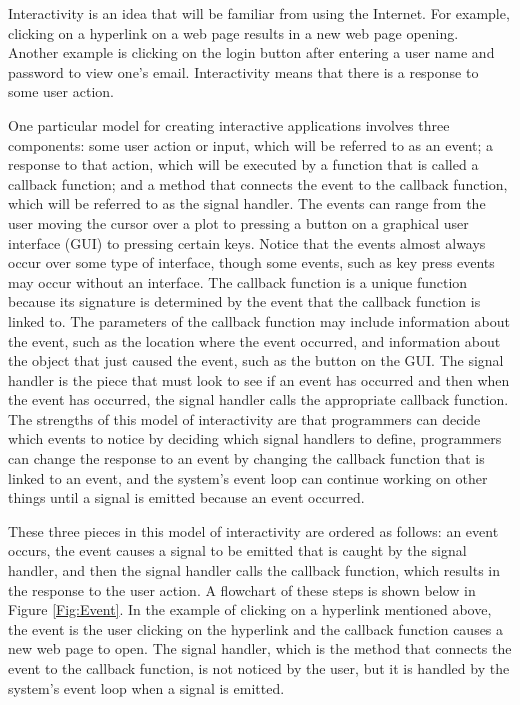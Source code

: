 \documentclass{article}[11pt]
\begin{document}
Interactivity is an idea that will be familiar from using the Internet.  For
example, clicking on a hyperlink on a web page results in a new web page
opening.  Another example is clicking on the login button after entering a
user name and password to view one's email.  Interactivity means that there is
a response to some user action.  

One particular model for creating interactive applications involves three
components: some user action or input, which will be referred to as an event;
a response to that action, which will be executed by a function that is called
a callback function; and a method that connects the event to the callback
function, which will be referred to as the signal handler.  The events can
range from the user moving the cursor over a plot to pressing a button on a
graphical user interface (GUI) to pressing certain keys.  Notice that the
events almost always occur over some type of interface, though some events,
such as key press events may occur without an interface.  The callback
function is a unique function because its signature is determined by the event
that the callback function is linked to.  The parameters of the callback
function may include information about the event, such as the location where
the event occurred, and information about the object that just caused the
event, such as the button on the GUI.  The signal handler is the piece that
must look to see if an event has occurred and then when the event has
occurred, the signal handler calls the appropriate callback function.  The
strengths of this model of interactivity are that programmers can decide which
events to notice by deciding which signal handlers to define, programmers
can change the response to an event by changing the callback function that is
linked to an event, and the system's event loop can continue working on other
things until a signal is emitted because an event occurred.

These three pieces in this model of interactivity are ordered as follows:
an event occurs, the event causes a signal to be emitted that is caught by the
signal handler, and then the signal handler calls the callback function, which
results in the response to the user action.  A flowchart of these steps is
shown below in Figure \ref{Fig:Event}.  In the example of clicking on a
hyperlink mentioned above, the event is the user clicking on the
hyperlink and the callback function causes a new web page to open.
The signal handler, which is the method that connects the event to the
callback function, is not noticed by the user, but it is handled by the
system's event loop when a signal is emitted.
\end{document}
